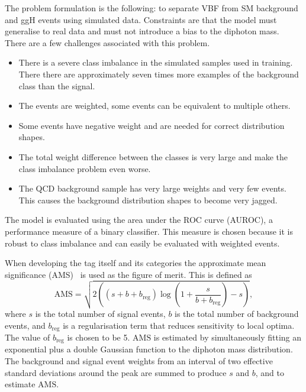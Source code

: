 The problem formulation is the following: to separate VBF from SM background and ggH events using simulated data. 
Constraints are that the model must generalise to real data and must not introduce a bias to the diphoton mass. 
There are a few challenges associated with this problem.
\begin{itemize}[noitemsep]
    \item There is a severe class imbalance in the simulated samples used in training. There there are approximately seven times more examples of the background class than the signal.
    \item The events are weighted, some events can be equivalent to multiple others.
    \item Some events have negative weight and are needed for correct distribution shapes.
    \item The total weight difference between the classes is very large and make the class imbalance problem even worse.
    \item The QCD background sample has very large weights and very few events. This causes the background distribution shapes to become very jagged. 
\end{itemize}



The model is evaluated using the area under the ROC curve (AUROC), a performance measure of a binary classifier. 
This measure is chosen because it is robust to class imbalance and can easily be evaluated with weighted events.

When developing the tag itself and its categories the approximate mean significance (AMS)~\cite{HiggsML} is used as the figure of merit. This is defined as
\begin{equation}
    \mathrm{AMS} = \sqrt{2\left( (s+b+b_{\mathrm{reg}})\log\left(1 + \frac{s}{b+b_{\mathrm{reg}}}\right) - s \right)},
\end{equation}
where $s$ is the total number of signal events, $b$ is the total number of background events, and $b_{\mathrm{reg}}$ is a regularisation term that reduces sensitivity to local optima. 
The value of $b_{\mathrm{reg}}$ is chosen to be 5. 
$\mathrm{AMS}$ is estimated by simultaneously fitting an exponential plus a double Gaussian function to the diphoton mass distribution. 
The background and signal event weights from an interval of two effective standard deviations around the peak are summed to produce $s$ and $b$, and to estimate $\mathrm{AMS}$. 







